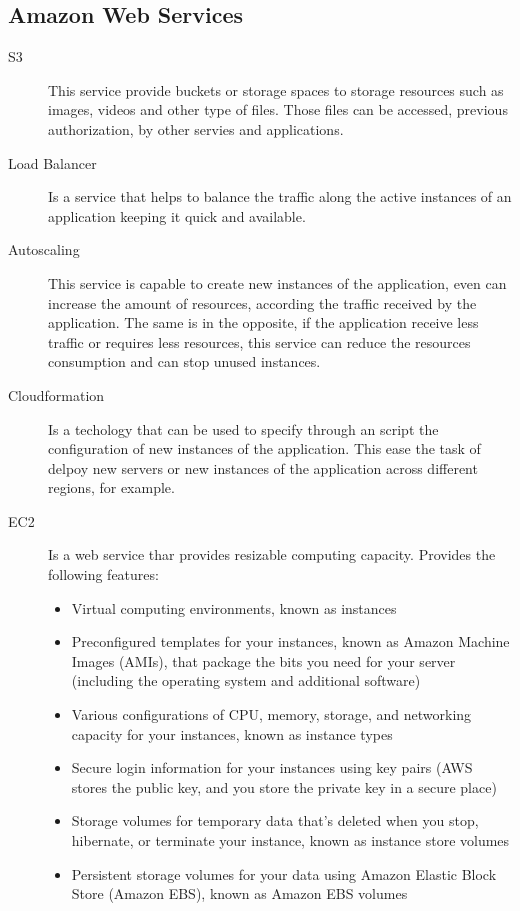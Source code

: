 \subsection{Amazon Web Services}
\begin{multicols}{2}
\begin{description}
\item[S3] This service provide buckets or storage spaces to storage resources such as images, videos and other type of files. Those files can be accessed, previous authorization, by other servies and applications.
\item[Load Balancer] Is a service that helps to balance the traffic along the active instances of an application keeping it quick and available.
\item[Autoscaling] This service is capable to create new instances of the application, even can increase the amount of resources, according the traffic received by the application. The same is in the opposite, if the application receive less traffic or requires less resources, this service can reduce the resources consumption and can stop unused instances.
\item[Cloudformation] Is a techology that can be used to specify through an script the configuration of new instances of the application. This ease the task of delpoy new servers or new instances of the application across different regions, for example.
\item[EC2] Is a web service thar provides resizable computing capacity. Provides the following features:
\begin{itemize}
\item Virtual computing environments, known as instances
\item Preconfigured templates for your instances, known as Amazon Machine Images (AMIs), that package the bits you need for your server (including the operating system and additional software)
\item Various configurations of CPU, memory, storage, and networking capacity for your instances, known as instance types
\item Secure login information for your instances using key pairs (AWS stores the public key, and you store the private key in a secure place)
\item Storage volumes for temporary data that's deleted when you stop, hibernate, or terminate your instance, known as instance store volumes
\item Persistent storage volumes for your data using Amazon Elastic Block Store (Amazon EBS), known as Amazon EBS volumes

\end{itemize}
\end{description}
\end{multicols}

